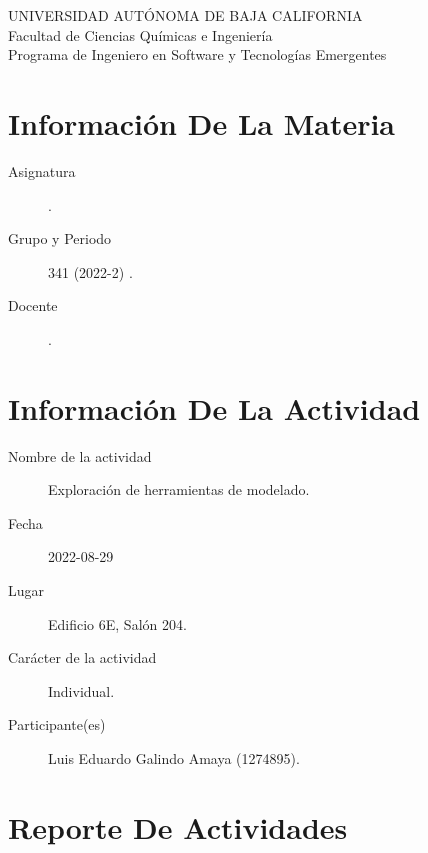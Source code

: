 \documentclass[12pt]{article}
\begin{document}
\thispagestyle{empty}
\begin{center}
	{\large
		UNIVERSIDAD AUTÓNOMA DE BAJA CALIFORNIA \\
		Facultad de Ciencias Químicas e Ingeniería }
	\vspace{0.25in} \\
	Programa de Ingeniero en Software y Tecnologías Emergentes
\end{center}


\section*{Información De La Materia}
\label{sec:orgc408c03}
\begin{mdframed}
\begin{description}
\item[{Asignatura}] \asignatura .
\item[{Grupo y Periodo}] 341 (2022-2) .
\item[{Docente}] \docente .
\end{description}
\end{mdframed}

\section*{Información De La Actividad}
\label{sec:org9524b47}
\begin{mdframed}
\begin{description}
\item[{Nombre de la actividad}] Exploración de herramientas de modelado.
\item[{Fecha}] 2022-08-29
\item[{Lugar}] Edificio 6E, Salón 204.
\item[{Carácter de la actividad}] Individual.
\item[{Participante(es)}] Luis Eduardo Galindo Amaya (1274895).
\end{description}
\end{mdframed}

\section*{Reporte De Actividades}
\label{sec:org8b3e925}
\end{document}
